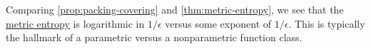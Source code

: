 \begin{remark}
  Comparing \autoref{prop:packing-covering} and \autoref{thm:metric-entropy}, we see that the \hyperref[def:metric-entropy]{metric entropy} is logarithmic in \(1 / \epsilon \) versus some exponent of \(1 / \epsilon \). This is typically the hallmark of a parametric versus a nonparametric function class.
\end{remark}
